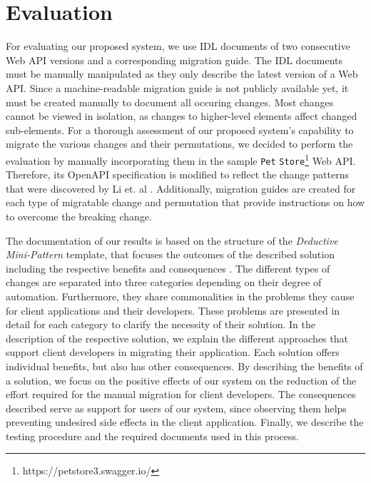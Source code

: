 \section{Evaluation}
\label{sec:Evaluation}
For evaluating our proposed system, we use IDL documents of two consecutive Web API versions and a corresponding migration guide. The IDL documents must be manually manipulated as they only describe the latest version of a Web API. Since a machine-readable migration guide is not publicly available yet, it must be created manually to document all occuring changes. Most changes cannot be viewed in isolation, as changes to higher-level elements affect changed sub-elements. For a thorough assessment of our proposed system's capability to migrate the various changes and their permutations, we decided to perform the evaluation by manually incorporating them in the sample \texttt{Pet} \texttt{Store}\footnote{https://petstore3.swagger.io/} Web API. Therefore, its OpenAPI specification is modified to reflect the change patterns that were discovered by Li et. al \cite{li_how_2013}. Additionally, migration guides are created for each type of migratable change and permutation that provide instructions on how to overcome the breaking change. 

The documentation of our results is based on the structure of the 
\textit{Deductive Mini-Pattern} template, that focuses the outcomes of the described solution including the respective benefits and consequences \cite{brown_refactoring_1998}. The different types of changes are separated into three categories depending on their degree of automation. Furthermore, they share commonalities in the problems they cause for client applications and their developers. These problems are presented in detail for each category to clarify the necessity of their solution. In the description of the respective solution, we explain the different approaches that support client developers in migrating their application. Each solution offers individual benefits, but also has other consequences. By describing the benefits of a solution, we focus on the positive effects of our system on the reduction of the effort required for the manual migration for client developers. The consequences described serve as support for users of our system, since observing them helps preventing undesired side effects in the client application. Finally, we describe the testing procedure and the required documents used in this process.


\newpage

\newpage
